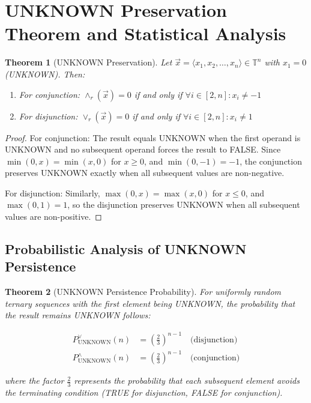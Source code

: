 \documentclass[11pt,a4paper]{article}
\newtheorem{theorem}{Theorem}
\begin{document}
\section{UNKNOWN Preservation Theorem and Statistical Analysis}

\begin{theorem}[UNKNOWN Preservation]
Let $\vec{x} = \langle x_1, x_2, \ldots, x_n \rangle \in \mathbb{T}^n$ with $x_1 = 0$ (UNKNOWN). Then:
\begin{enumerate}
\item For conjunction: $\land_r(\vec{x}) = 0$ if and only if $\forall i \in [2,n]: x_i \neq -1$
\item For disjunction: $\lor_r(\vec{x}) = 0$ if and only if $\forall i \in [2,n]: x_i \neq 1$
\end{enumerate}
\end{theorem}

\begin{proof}
For conjunction: The result equals UNKNOWN when the first operand is UNKNOWN and no subsequent operand forces the result to FALSE. Since $\min(0, x) = \min(x, 0)$ for $x \geq 0$, and $\min(0, -1) = -1$, the conjunction preserves UNKNOWN exactly when all subsequent values are non-negative.

For disjunction: Similarly, $\max(0, x) = \max(x, 0)$ for $x \leq 0$, and $\max(0, 1) = 1$, so the disjunction preserves UNKNOWN when all subsequent values are non-positive.
\end{proof}

\subsection{Probabilistic Analysis of UNKNOWN Persistence}

\begin{theorem}[UNKNOWN Persistence Probability]
For uniformly random ternary sequences with the first element being UNKNOWN, the probability that the result remains UNKNOWN follows:

\begin{align}
P_{\text{UNKNOWN}}^{\lor}(n) &= \left(\frac{2}{3}\right)^{n-1} \quad \text{(disjunction)} \\
P_{\text{UNKNOWN}}^{\land}(n) &= \left(\frac{2}{3}\right)^{n-1} \quad \text{(conjunction)}
\end{align}

where the factor $\frac{2}{3}$ represents the probability that each subsequent element avoids the terminating condition (TRUE for disjunction, FALSE for conjunction).
\end{theorem}
\end{document}
